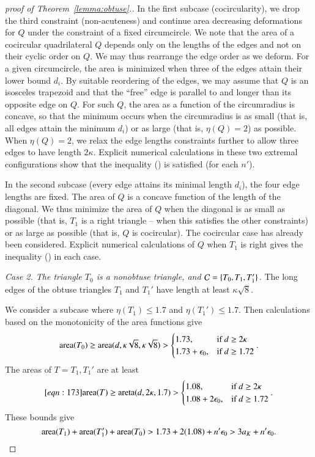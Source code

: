 \begin{proof}[proof of Theorem~\ref{lemma:obtuse}.]
In the first subcase (cocircularity), we drop the third constraint
(non-acuteness) and continue area decreasing deformations for $Q$
under the constraint of a fixed circumcircle.  We note that the area of
a cocircular quadrilateral $Q$ depends only on the lengths of the
edges and not on their cyclic order on $Q$.  We may thus rearrange the
edge order as we deform.  For a given circumcircle, the area is
minimized when three of the edges attain their lower bound $d_i$.  By
suitable reordering of the edges, we may assume that $Q$ is an
isosceles trapezoid and that the ``free'' edge is parallel to and
longer than its opposite edge on $Q$.  For such $Q$, the area as a
function of the circumradius is concave, so that the minimum occurs
when the circumradius is as small (that is, all edges attain the
minimum $d_i$) or as large (that is, $\eta(Q)=2$) as possible.
When $\eta(Q)=2$, we relax the edge lengths constraints further
to allow three edges to have length $2\kappa$.
Explicit numerical calculations in these two extremal configurations
show that the inequality () is satisfied (for each $n'$).

In the second subcase (every edge attains its minimal length $d_i$), the
four edge lengths are fixed.  The area of $Q$ is a concave function of
the length of the diagonal.  We thus minimize the area of $Q$ when the
diagonal is as small as possible (that is, $T_1$ is a right triangle
-- when this satisfies the other constraints) or as large as possible
(that is, $Q$ is cocircular).  The cocircular case has already been
considered.  Explicit numerical calculations of $Q$ when $T_1$ is
right gives the inequality () in each case.




{\it Case 2. The triangle $T_0$ is a nonobtuse triangle, and $\mathcal C=\{T_0,T_1,T_1'\}$.}
The long edges of the obtuse triangles $T_1$ and $T_1'$ have length at least
$\kappa\sqrt{8}$.

We consider a subcase where $\eta(T_1)\le 1.7$ and $\eta(T_1') \le
1.7$.  Then calculations based on the monotonicity of the area
functions give
\[
{\operatorname{area}}(T_0) \ge {\operatorname{area}}(d,\kappa\sqrt{8},\kappa\sqrt{8}) > 
   \begin{cases}1.73,&\text{if } d \ge 2\kappa\\ 
     1.73+\epsilon_0, & \text{if } d \ge 1.72 \end{cases}.
\]
The areas of $T=T_1,T_1'$ are at least
\begin{equation}\libel{eqn:173}
\area(T) \ge \areta(d,2\kappa,1.7) >
   \begin{cases}1.08,&\text{if } d \ge 2\kappa\\
     1.08+2\epso, & \text{if } d \ge 1.72 \end{cases}.
\end{equation}
These bounds give
\[
{\operatorname{area}}(T_1) + {\operatorname{area}}(T_1') + {\operatorname{area}}(T_0) > 1.73 + 2(1.08) + n'\epsilon_0 > 
3 a_K + n' \epsilon_0.
\]


\end{proof}
